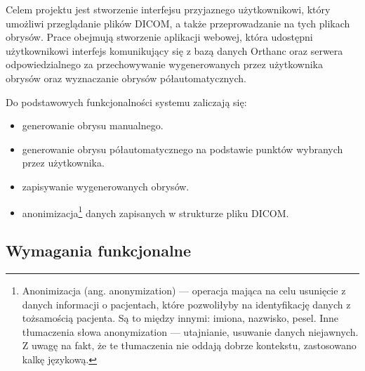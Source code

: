 \documentclass[a4paper,11pt,twoside,openright]{report}
\theoremstyle{definition}
\begin{document}
Celem projektu jest stworzenie interfejsu przyjaznego użytkownikowi, który umożliwi przeglądanie plików DICOM, a także przeprowadzanie na tych plikach obrysów. Prace obejmują stworzenie aplikacji webowej, która udostępni użytkownikowi interfejs komunikujący się z bazą danych Orthanc oraz serwera odpowiedzialnego za przechowywanie wygenerowanych przez użytkownika obrysów oraz wyznaczanie obrysów półautomatycznych.

Do podstawowych funkcjonalności systemu zaliczają się:
\begin{itemize}[noitemsep]
\item generowanie obrysu manualnego.
\item generowanie obrysu półautomatycznego na podstawie punktów wybranych przez użytkownika.
\item zapisywanie wygenerowanych obrysów.
\item anonimizacja\footnote {Anonimizacja (ang. anonymization) --- operacja mająca na celu usunięcie z danych informacji o pacjentach, które pozwoliłyby na identyfikację danych z tożsamością pacjenta. Są to między innymi: imiona, nazwisko, pesel. Inne tłumaczenia słowa anonymization --- utajnianie, usuwanie danych niejawnych. Z uwagę na fakt, że te tłumaczenia nie oddają dobrze kontekstu, zastosowano kalkę językową.} danych zapisanych w strukturze pliku DICOM.
\end{itemize}

\subsection {Wymagania funkcjonalne}
\end{document}
